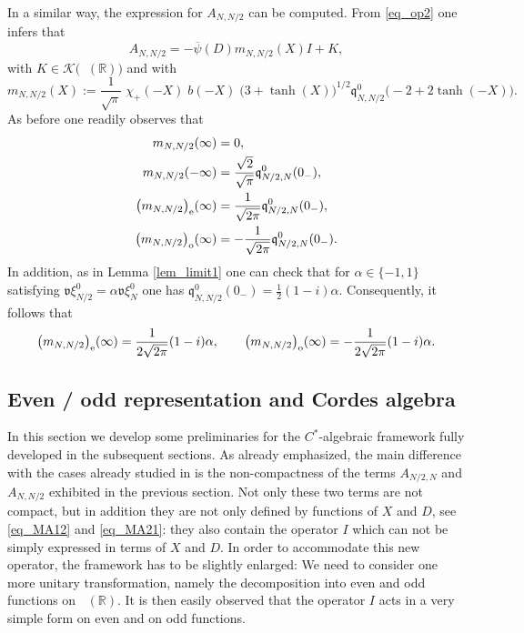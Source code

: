 \documentclass[11pt]{article}
\def\K{\mathscr K}
\def\R{\mathbb R}
\def\v{\mathfrak v}
\def\ltwo{\mathop{\mathrm{L}^2}\nolimits}
\def\q{\mathfrak{q}}
\begin{document}
In a similar way, the expression for $A_{N,N/2}$ can be computed.
From \eqref{eq_op2} one infers that
\begin{equation}\label{eq_MA21}
A_{N,N/2}=  -\overline{\psi}(D) m_{N,N/2}(X) I + K,
\end{equation}
with $K\in \K\big(\ltwo(\R)\big)$ and with
$$
m_{N,N/2}(X):= \frac{1}{\sqrt{\pi}}\;\!\chi_+(-X) \;\!b(-X)\;\! \big(3+\tanh(X)\big)^{1/2} \q^0_{N,N/2}\big(-2+2\tanh(-X)\big).
$$
As before one readily observes that
\begin{align*}
m_{N,N/2}(\infty) & = 0, \\
m_{N,N/2}(-\infty) & = \frac{\sqrt{2}}{\sqrt{\pi}}\q^0_{N/2,N}(0_-), \\
\big(m_{N,N/2}\big)_{\rm e}(\infty) & = \frac{1}{\sqrt{2\pi}}\q^0_{N/2,N}(0_-), \\
\big(m_{N,N/2}\big)_{\rm o}(\infty) & = -\frac{1}{\sqrt{2\pi}}\q^0_{N/2,N}(0_-). 
\end{align*}
In addition, as in Lemma \ref{lem_limit1} one can check that 
for $\alpha\in \{-1,1\}$ satisfying $\v\xi^0_{N/2}=\alpha \v \xi^0_N$  one has
$\q^0_{N,N/2}(0_-) = \frac{1}{2}(1-i)\alpha$.
Consequently, it follows that 
$$
\big(m_{N,N/2}\big)_{\rm e}(\infty) = \frac{1}{2\sqrt{2\pi}}(1-i)\alpha, \qquad 
\big(m_{N,N/2}\big)_{\rm o}(\infty) = -\frac{1}{2\sqrt{2\pi}}(1-i)\alpha. 
$$

\subsection{Even / odd representation and Cordes algebra}\label{sec_Cordes_alg}

In this section we develop some preliminaries for the $C^*$-algebraic framework
fully developed in the subsequent sections. As already emphasized, the main difference with the 
cases already studied in \cite{APRR} is the non-compactness 
of the terms $A_{N/2,N}$ and $A_{N,N/2}$ exhibited in the previous section.
Not only these two terms are not compact, but in addition they are not only defined
by functions of $X$ and $D$, see \eqref{eq_MA12} and \eqref{eq_MA21}: they also contain
the operator $I$ which can not be simply expressed in terms of $X$ and $D$.
In order to accommodate this new operator, the framework has to be slightly enlarged:
We need to consider one more unitary 
transformation, namely the decomposition into even and odd functions on $\ltwo(\R)$.
It is then easily observed that the operator $I$ acts in a very simple form on even and on odd functions.
\end{document}
